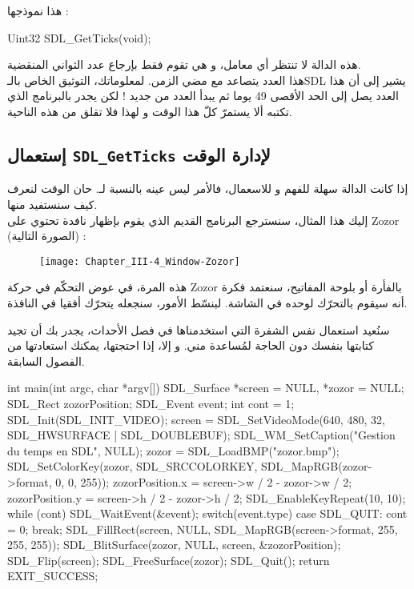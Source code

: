 هذا نموذجها :

\begin{Csource}
Uint32 SDL_GetTicks(void);
\end{Csource}

هذه الدالة لا تنتظر أي معامل، و هي تقوم فقط بإرجاع عدد الثواني المنقضية. \\
هذا العدد يتصاعد مع مضي الزمن. لمعلوماتك، التوثيق الخاص بالـ\textenglish{SDL}
يشير إلى أن هذا العدد يصل إلى الحد الأقصى 49 يوما ثم يبدأ العدد من جديد ! لكن يجدر بالبرنامج الذي تكتبه ألا يستمرّ كلّ هذا الوقت و لهذا فلا تقلق من هذه الناحية.

\subsection{إستعمال \texttt{SDL\_GetTicks} لإدارة الوقت}

إذا كانت الدالة
سهلة للفهم و للاسعمال، فالأمر ليس عينه بالنسبة لـ.
حان الوقت لنعرف كيف سنستفيد منها.\\
إليك هذا المثال، سنسترجع البرنامج القديم الذي يقوم بإظهار نافدة تحتوي على
\textenglish{Zozor}
(الصورة التالية) :

\begin{figure}[H]
	\centering
	\texttt{[image: Chapter\_III-4\_Window-Zozor]}
\end{figure}

هذه المرة، في عوض التحكّم في حركة
\textenglish{Zozor}
بالفأرة أو بلوحة المفاتيح، سنعتمد فكرة أنه سيقوم بالتحرّك لوحده في الشاشة. لبنسّط الأمور، سنجعله يتحرّك أفقيا في النافذة. 

سنُعيد استعمال نفس الشفرة التي استخدمناها في فصل الأحداث، يجدر بك أن تجيد كتابتها بنفسك دون الحاجة لمُساعدة مني. و إلا،  إذا احتجتها، يمكنك استعادتها من الفصول السابقة.

\begin{Csource}
int main(int argc, char *argv[])
{
	SDL_Surface *screen = NULL, *zozor = NULL;
	SDL_Rect zozorPosition;
	SDL_Event event;
	int cont = 1;
	SDL_Init(SDL_INIT_VIDEO);
	screen = SDL_SetVideoMode(640, 480, 32, SDL_HWSURFACE | SDL_DOUBLEBUF);
	SDL_WM_SetCaption("Gestion du temps en SDL", NULL);
	zozor = SDL_LoadBMP("zozor.bmp");
	SDL_SetColorKey(zozor, SDL_SRCCOLORKEY, SDL_MapRGB(zozor->format, 0, 0, 255));
	zozorPosition.x = screen->w / 2 - zozor->w / 2;
	zozorPosition.y = screen->h / 2 - zozor->h / 2;
	SDL_EnableKeyRepeat(10, 10);
	while (cont)
	{
		SDL_WaitEvent(&event);
		switch(event.type)
		{
			case SDL_QUIT:
			cont = 0;
			break;
		}
		SDL_FillRect(screen, NULL, SDL_MapRGB(screen->format, 255, 255, 255));
		SDL_BlitSurface(zozor, NULL, screen, &zozorPosition);
		SDL_Flip(screen);
	}
	SDL_FreeSurface(zozor);
	SDL_Quit();
	return EXIT_SUCCESS;
}
\end{Csource}

